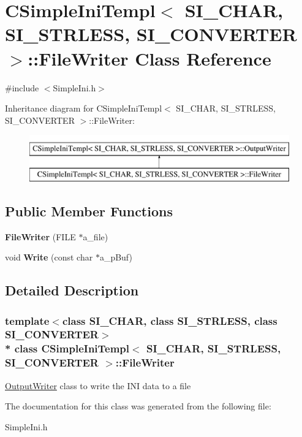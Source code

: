 \hypertarget{a00011}{}\section{C\+Simple\+Ini\+Templ$<$ S\+I\+\_\+\+C\+H\+AR, S\+I\+\_\+\+S\+T\+R\+L\+E\+SS, S\+I\+\_\+\+C\+O\+N\+V\+E\+R\+T\+ER $>$\+:\+:File\+Writer Class Reference}
\label{a00011}


{\ttfamily \#include $<$Simple\+Ini.\+h$>$}

Inheritance diagram for C\+Simple\+Ini\+Templ$<$ S\+I\+\_\+\+C\+H\+AR, S\+I\+\_\+\+S\+T\+R\+L\+E\+SS, S\+I\+\_\+\+C\+O\+N\+V\+E\+R\+T\+ER $>$\+:\+:File\+Writer\+:\begin{figure}[H]
\begin{center}
\leavevmode
\includegraphics[height=2.000000cm]{a00011}
\end{center}
\end{figure}
\subsection*{Public Member Functions}
\begin{DoxyCompactItemize}
\item 
{\bfseries File\+Writer} (F\+I\+LE $\ast$a\+\_\+file)\hypertarget{a00011_aecd4d79480c9b4e70b598c10014856f8}{}\label{a00011_aecd4d79480c9b4e70b598c10014856f8}

\item 
void {\bfseries Write} (const char $\ast$a\+\_\+p\+Buf)\hypertarget{a00011_ae8885b97884ef9dd5bf074bc4f011373}{}\label{a00011_ae8885b97884ef9dd5bf074bc4f011373}

\end{DoxyCompactItemize}


\subsection{Detailed Description}
\subsubsection*{template$<$class S\+I\+\_\+\+C\+H\+AR, class S\+I\+\_\+\+S\+T\+R\+L\+E\+SS, class S\+I\+\_\+\+C\+O\+N\+V\+E\+R\+T\+ER$>$\\*
class C\+Simple\+Ini\+Templ$<$ S\+I\+\_\+\+C\+H\+A\+R, S\+I\+\_\+\+S\+T\+R\+L\+E\+S\+S, S\+I\+\_\+\+C\+O\+N\+V\+E\+R\+T\+E\+R $>$\+::\+File\+Writer}

\hyperlink{a00020}{Output\+Writer} class to write the I\+NI data to a file 

The documentation for this class was generated from the following file\+:\begin{DoxyCompactItemize}
\item 
Simple\+Ini.\+h\end{DoxyCompactItemize}
